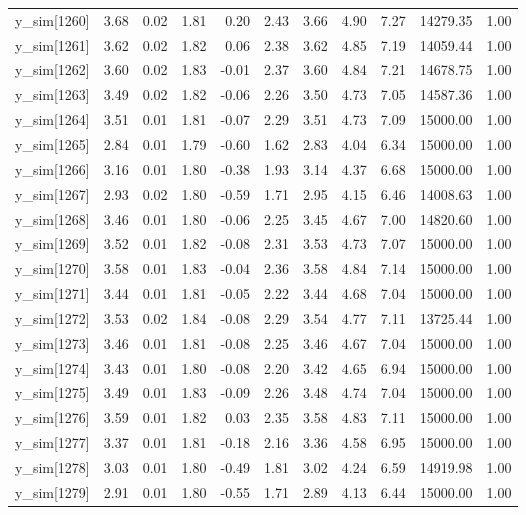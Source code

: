 \begin{table}[ht]
\begin{tabular}{rrrrrrrrrrr}
  y\_sim[1260] & 3.68 & 0.02 & 1.81 & 0.20 & 2.43 & 3.66 & 4.90 & 7.27 & 14279.35 & 1.00 \\ 
  y\_sim[1261] & 3.62 & 0.02 & 1.82 & 0.06 & 2.38 & 3.62 & 4.85 & 7.19 & 14059.44 & 1.00 \\ 
  y\_sim[1262] & 3.60 & 0.02 & 1.83 & -0.01 & 2.37 & 3.60 & 4.84 & 7.21 & 14678.75 & 1.00 \\ 
  y\_sim[1263] & 3.49 & 0.02 & 1.82 & -0.06 & 2.26 & 3.50 & 4.73 & 7.05 & 14587.36 & 1.00 \\ 
  y\_sim[1264] & 3.51 & 0.01 & 1.81 & -0.07 & 2.29 & 3.51 & 4.73 & 7.09 & 15000.00 & 1.00 \\ 
  y\_sim[1265] & 2.84 & 0.01 & 1.79 & -0.60 & 1.62 & 2.83 & 4.04 & 6.34 & 15000.00 & 1.00 \\ 
  y\_sim[1266] & 3.16 & 0.01 & 1.80 & -0.38 & 1.93 & 3.14 & 4.37 & 6.68 & 15000.00 & 1.00 \\ 
  y\_sim[1267] & 2.93 & 0.02 & 1.80 & -0.59 & 1.71 & 2.95 & 4.15 & 6.46 & 14008.63 & 1.00 \\ 
  y\_sim[1268] & 3.46 & 0.01 & 1.80 & -0.06 & 2.25 & 3.45 & 4.67 & 7.00 & 14820.60 & 1.00 \\ 
  y\_sim[1269] & 3.52 & 0.01 & 1.82 & -0.08 & 2.31 & 3.53 & 4.73 & 7.07 & 15000.00 & 1.00 \\ 
  y\_sim[1270] & 3.58 & 0.01 & 1.83 & -0.04 & 2.36 & 3.58 & 4.84 & 7.14 & 15000.00 & 1.00 \\ 
  y\_sim[1271] & 3.44 & 0.01 & 1.81 & -0.05 & 2.22 & 3.44 & 4.68 & 7.04 & 15000.00 & 1.00 \\ 
  y\_sim[1272] & 3.53 & 0.02 & 1.84 & -0.08 & 2.29 & 3.54 & 4.77 & 7.11 & 13725.44 & 1.00 \\ 
  y\_sim[1273] & 3.46 & 0.01 & 1.81 & -0.08 & 2.25 & 3.46 & 4.67 & 7.04 & 15000.00 & 1.00 \\ 
  y\_sim[1274] & 3.43 & 0.01 & 1.80 & -0.08 & 2.20 & 3.42 & 4.65 & 6.94 & 15000.00 & 1.00 \\ 
  y\_sim[1275] & 3.49 & 0.01 & 1.83 & -0.09 & 2.26 & 3.48 & 4.74 & 7.04 & 15000.00 & 1.00 \\ 
  y\_sim[1276] & 3.59 & 0.01 & 1.82 & 0.03 & 2.35 & 3.58 & 4.83 & 7.11 & 15000.00 & 1.00 \\ 
  y\_sim[1277] & 3.37 & 0.01 & 1.81 & -0.18 & 2.16 & 3.36 & 4.58 & 6.95 & 15000.00 & 1.00 \\ 
  y\_sim[1278] & 3.03 & 0.01 & 1.80 & -0.49 & 1.81 & 3.02 & 4.24 & 6.59 & 14919.98 & 1.00 \\ 
  y\_sim[1279] & 2.91 & 0.01 & 1.80 & -0.55 & 1.71 & 2.89 & 4.13 & 6.44 & 15000.00 & 1.00 \\ 

\end{tabular}
\end{table}
